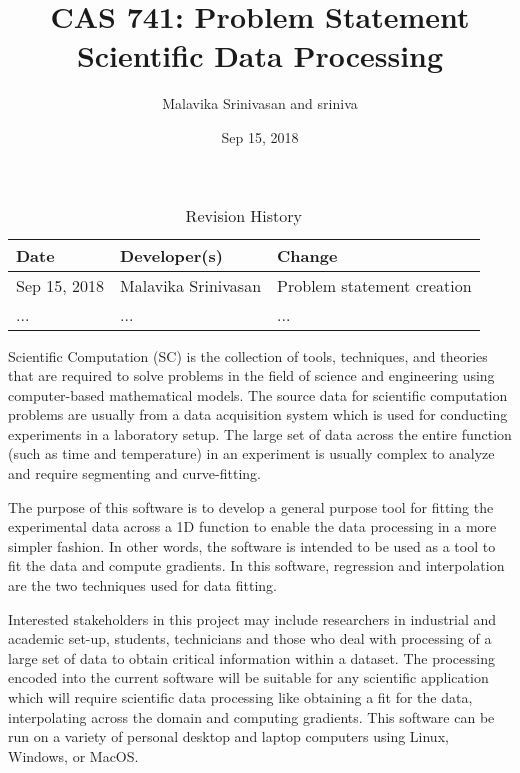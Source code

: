 \documentclass{article}
\title{CAS 741: Problem Statement\\ Scientific Data Processing}
\author{Malavika Srinivasan and sriniva}
\date{Sep 15, 2018}
\begin{document}
\maketitle

\begin{table}[hp]
\caption{Revision History} \label{TblRevisionHistory}
\begin{tabularx}{\textwidth}{llX}
\toprule
\textbf{Date} & \textbf{Developer(s)} & \textbf{Change}\\
\midrule
Sep 15, 2018 & Malavika Srinivasan & Problem statement creation\\
... & ... & ...\\
\bottomrule
\end{tabularx}
\end{table}

Scientific Computation (SC) is the collection of tools, techniques, and
theories that are required to solve problems in the field of science and
engineering using computer-based mathematical models. The source data for
scientific computation problems are usually 
from a data acquisition system 
which is used for conducting experiments in a laboratory setup. The large set
of data across the entire function (such as time and temperature) in an
experiment is usually complex to analyze and require segmenting and
curve-fitting.

The purpose of this software  is to develop a general
purpose tool  for fitting the experimental data across a 1D
function to enable the data processing in a more simpler fashion. In other
words, the software is intended to be used as a tool to fit the data and compute
gradients. 
In this software, regression and interpolation are the two techniques used for
data fitting.

Interested stakeholders in this project may include researchers in industrial
and academic set-up, students, technicians and those who deal with processing of
a large set of data to obtain critical information within a dataset. The
processing encoded into the current software will be suitable for any scientific
application which will require scientific data processing like obtaining a fit
for the data, interpolating across the domain and computing gradients.  This software can be run on a variety of
personal desktop and laptop computers using Linux, Windows, or MacOS.





\end{document}
